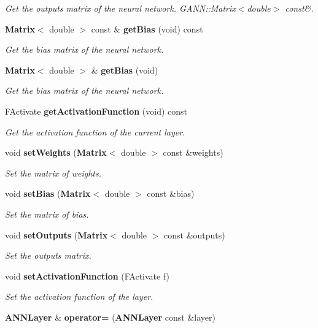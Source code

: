 \begin{DoxyCompactItemize}
\begin{DoxyCompactList}\small\item\em Get the outputs matrix of the neural network.  G\+A\+N\+N\+::\+Matrix$<$double$>$ const\&. \end{DoxyCompactList}\item 
{\bf Matrix}$<$ double $>$ const \& {\bf get\+Bias} (void) const 
\begin{DoxyCompactList}\small\item\em Get the bias matrix of the neural network. \end{DoxyCompactList}\item 
{\bf Matrix}$<$ double $>$ \& {\bf get\+Bias} (void)
\begin{DoxyCompactList}\small\item\em Get the bias matrix of the neural network. \end{DoxyCompactList}\item 
F\+Activate {\bf get\+Activation\+Function} (void) const 
\begin{DoxyCompactList}\small\item\em Get the activation function of the current layer. \end{DoxyCompactList}\item 
void {\bf set\+Weights} ({\bf Matrix}$<$ double $>$ const \&weights)
\begin{DoxyCompactList}\small\item\em Set the matrix of weights. \end{DoxyCompactList}\item 
void {\bf set\+Bias} ({\bf Matrix}$<$ double $>$ const \&bias)
\begin{DoxyCompactList}\small\item\em Set the matrix of bias. \end{DoxyCompactList}\item 
void {\bf set\+Outputs} ({\bf Matrix}$<$ double $>$ const \&outputs)
\begin{DoxyCompactList}\small\item\em Set the outputs matrix. \end{DoxyCompactList}\item 
void {\bf set\+Activation\+Function} (F\+Activate f)
\begin{DoxyCompactList}\small\item\em Set the activation function of the layer. \end{DoxyCompactList}\item 
{\bf A\+N\+N\+Layer} \& {\bfseries operator=} ({\bf A\+N\+N\+Layer} const \&layer)\label{class_g_a_n_n_1_1_a_n_n_layer_a2b22cd2b08de3d0b41615dd6be0198d4}


\end{DoxyCompactItemize}
